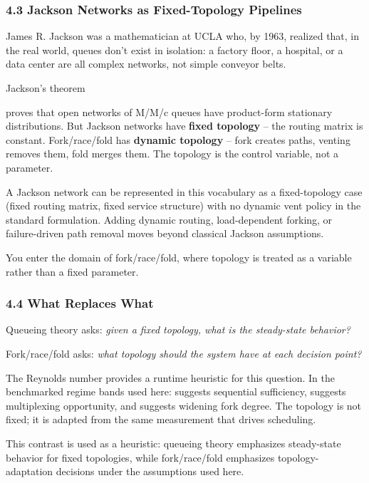 \documentclass[
]{article}
\begin{document}
\subsubsection{\texorpdfstring{\textbf{4.3 Jackson Networks as
Fixed-Topology
Pipelines}}{4.3 Jackson Networks as Fixed-Topology Pipelines}}\label{jackson-networks-as-fixed-topology-pipelines}

James R. Jackson was a mathematician at UCLA who, by 1963, realized
that, in the real world, queues don't exist in isolation: a factory
floor, a hospital, or a data center are all complex networks, not simple
conveyor belts.

Jackson's theorem

proves that open networks of M/M/c queues have product-form stationary
distributions. But Jackson networks have \textbf{fixed topology} -- the
routing matrix is constant. Fork/race/fold has \textbf{dynamic topology}
-- fork creates paths, venting removes them, fold merges them. The
topology is the control variable, not a parameter.

A Jackson network can be represented in this vocabulary as a
fixed-topology case (fixed routing matrix, fixed service structure) with
no dynamic vent policy in the standard formulation. Adding dynamic
routing, load-dependent forking, or failure-driven path removal moves
beyond classical Jackson assumptions.

You enter the domain of fork/race/fold, where topology is treated as a
variable rather than a fixed parameter.

\subsubsection{\texorpdfstring{\textbf{4.4 What Replaces
What}}{4.4 What Replaces What}}\label{what-replaces-what}

Queueing theory asks: \emph{given a fixed topology, what is the
steady-state behavior?}

Fork/race/fold asks: \emph{what topology should the system have at each
decision point?}

The Reynolds number provides a runtime heuristic for this question. In
the benchmarked regime bands used here: suggests sequential sufficiency,
suggests multiplexing opportunity, and suggests widening fork degree.
The topology is not fixed; it is adapted from the same measurement that
drives scheduling.

This contrast is used as a heuristic: queueing theory emphasizes
steady-state behavior for fixed topologies, while fork/race/fold
emphasizes topology-adaptation decisions under the assumptions used
here.
\end{document}
